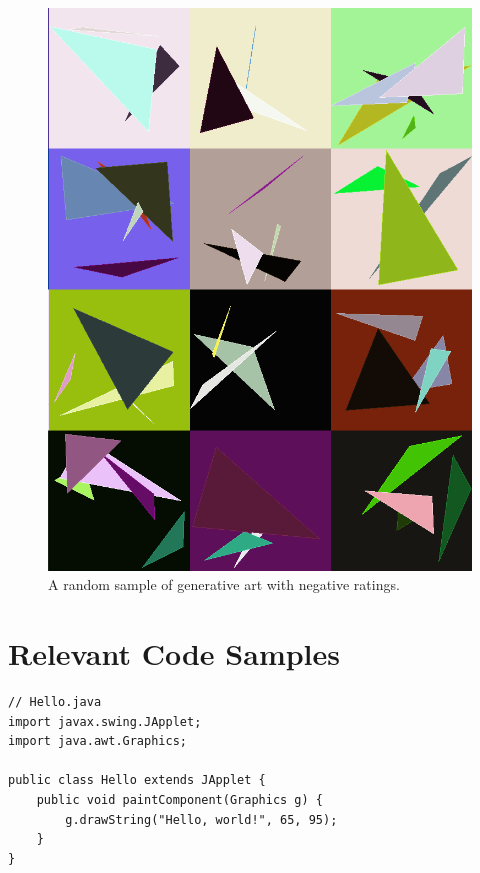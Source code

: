 \documentclass[midd]{thesis}
\begin{document}
\begin{figure}[tp]
\centering
\includegraphics[width=\textwidth]{visualizations/uglygallery-shortened.png}
\caption{A random sample of generative art with negative ratings.}
\label{fig:positive-geneartive-art}
\end{figure}

\chapter{Relevant Code Samples}



\begin{lstlisting}
// Hello.java
import javax.swing.JApplet;
import java.awt.Graphics;

public class Hello extends JApplet {
    public void paintComponent(Graphics g) {
        g.drawString("Hello, world!", 65, 95);
    }    
}
\end{lstlisting}

\nocite{*}

\end{document}
